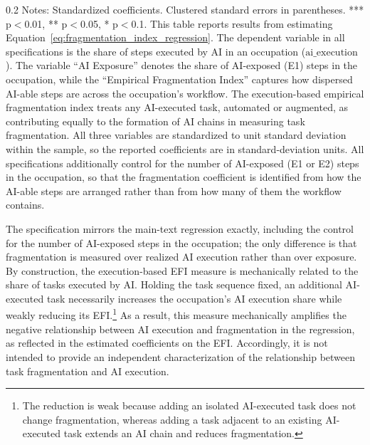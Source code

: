 \begin{table}[t]
    \caption{Role of AI-able Task Fragmentation in Determining AI Execution Outcomes (Execution-Based Empirical Fragmentation Measure)}
    \label{tab:fragmentation_index_regression_execution}
    \footnotesize
    \centering
    
    \begin{minipage}{1\linewidth}
\begin{spacing}{0.2}
{\fontsize{9.5pt}{10pt}\selectfont Notes: Standardized coefficients. Clustered standard errors in parentheses. *** p$<$0.01, ** p$<$0.05, * p$<$0.1.
This table reports results from estimating Equation~\eqref{eq:fragmentation_index_regression}.
The dependent variable in all specifications is the share of steps executed by AI in an occupation ($\text{ai\_execution}$).
The variable ``AI Exposure'' denotes the share of AI-exposed (E1) steps in the occupation, while the ``Empirical Fragmentation Index'' captures how dispersed AI-able steps are across the occupation's workflow.
The execution-based empirical fragmentation index treats any AI-executed task, automated or augmented, as contributing equally to the formation of AI chains in measuring task fragmentation.
All three variables are standardized to unit standard deviation within the sample, so the reported coefficients are in standard-deviation units. All specifications additionally control for the number of AI-exposed (E1 or E2) steps in the occupation, so that the fragmentation coefficient is identified from how the AI-able steps are arranged rather than from how many of them the workflow contains.}
\end{spacing}
\end{minipage}\end{table}

The specification mirrors the main-text regression exactly, including the control for the number of AI-exposed steps in the occupation; the only difference is that fragmentation is measured over realized AI execution rather than over exposure.
By construction, the execution-based EFI measure is mechanically related to the share of tasks executed by AI.
Holding the task sequence fixed, an additional AI-executed task necessarily increases the occupation's AI execution share while weakly reducing its EFI.\footnote{The reduction is weak because adding an isolated AI-executed task does not change fragmentation, whereas adding a task adjacent to an existing AI-executed task extends an AI chain and reduces fragmentation.}
As a result, this measure mechanically amplifies the negative relationship between AI execution and fragmentation in the regression, as reflected in the estimated coefficients on the EFI.
Accordingly, it is not intended to provide an independent characterization of the relationship between task fragmentation and AI execution.

